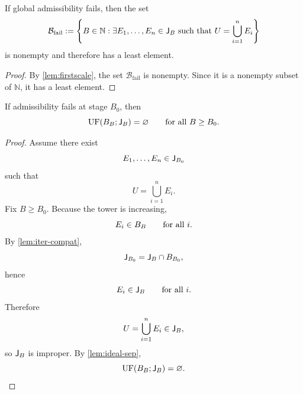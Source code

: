 \begin{theorem}
	If global admissibility fails, then the set
	\[
		\mathcal B_{\mathrm{fail}}
		:=
		\left\{
		B\in\mathbb N:
		\exists E_1,\dots,E_n\in\mathsf J_B
		\text{ such that }
		U=\bigcup_{i=1}^n E_i
		\right\}
	\]
	is nonempty and therefore has a least element.
\end{theorem}
\begin{proof}
	By \cref{lem:firstscale}, the set \(\mathcal B_{\mathrm{fail}}\) is
	nonempty. Since it is a nonempty subset of \(\mathbb N\), it has a least
	element.
\end{proof}
\begin{theorem}
	If admissibility fails at stage \(B_0\), then
	\[
		\operatorname{UF}(B_B;\mathsf J_B)=\varnothing
		\qquad
		\text{for all }B\ge B_0.
	\]
\end{theorem}
\begin{proof}
	Assume there exist
	\[
		E_1,\dots,E_n\in\mathsf J_{B_0}
	\]
	such that
	\[
		U=\bigcup_{i=1}^n E_i.
	\]
	Fix \(B\ge B_0\). Because the tower is increasing,
	\[
		E_i\in B_B
		\qquad
		\text{for all }i.
	\]
	By \cref{lem:iter-compat},
	\[
		\mathsf J_{B_0}=\mathsf J_B\cap B_{B_0},
	\]
	hence
	\[
		E_i\in\mathsf J_B
		\qquad
		\text{for all }i.
	\]
	Therefore
	\[
		U=\bigcup_{i=1}^n E_i\in\mathsf J_B,
	\]
	so \(\mathsf J_B\) is improper. By \cref{lem:ideal-sep},
	\[
		\operatorname{UF}(B_B;\mathsf J_B)=\varnothing.
	\]
\end{proof}
